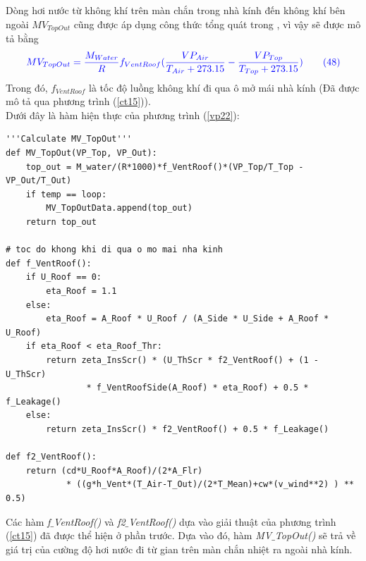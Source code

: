 \documentclass[13pt,a4paper]{article}
\begin{document}
			Dòng hơi nước từ không khí trên màn chắn trong nhà kính đến không khí bên ngoài $MV_{TopOut}$ cũng được áp dụng công thức tổng quát trong \cite{Van11}, vì vậy sẽ được mô tả bằng
			\begin{align}
				\color{blue}
					MV_{TopOut} = \frac{M_{Water}}{R}f_{VentRoof}(\dfrac{VP_{Air}}{T_{Air} + 273.15} - \dfrac{VP_{Top}}{T_{Top} + 273.15})
				\color{blue}
				\tag{48}\label{vp22}
			\end{align}
			Trong đó, $f_{VentRoof}$ là tốc độ luồng không khí đi qua ô mở mái nhà kính (Đã được mô tả qua phương trình (\ref{ct15})). \\
			Dưới đây là hàm hiện thực của phương trình (\ref{vp22}):
\begin{lstlisting}
'''Calculate MV_TopOut'''
def MV_TopOut(VP_Top, VP_Out):
	top_out = M_water/(R*1000)*f_VentRoof()*(VP_Top/T_Top - VP_Out/T_Out)
	if temp == loop: 
		MV_TopOutData.append(top_out)
	return top_out

# toc do khong khi di qua o mo mai nha kinh
def f_VentRoof():
	if U_Roof == 0:
		eta_Roof = 1.1
	else:
		eta_Roof = A_Roof * U_Roof / (A_Side * U_Side + A_Roof * U_Roof)
	if eta_Roof < eta_Roof_Thr:
		return zeta_InsScr() * (U_ThScr * f2_VentRoof() + (1 - U_ThScr) 
				* f_VentRoofSide(A_Roof) * eta_Roof) + 0.5 * f_Leakage()
	else:
		return zeta_InsScr() * f2_VentRoof() + 0.5 * f_Leakage()

def f2_VentRoof():
	return (cd*U_Roof*A_Roof)/(2*A_Flr) 
			* ((g*h_Vent*(T_Air-T_Out)/(2*T_Mean)+cw*(v_wind**2) ) ** 0.5)
\end{lstlisting}
			Các hàm \textit{f$\_$VentRoof()} và \textit{f2$\_$VentRoof()} dựa vào giải thuật của phương trình (\ref{ct15}) đã được thể hiện ở phần trước. Dựa vào đó, hàm \textit{MV$\_$TopOut()} sẽ trả về giá trị của cường độ hơi nước đi từ gian trên màn chắn nhiệt ra ngoài nhà kính. \\ \\
\end{document}
